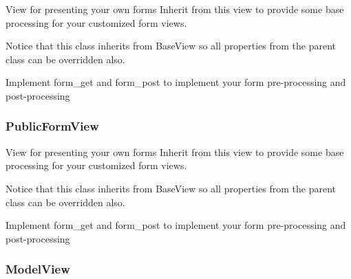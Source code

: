 \documentclass[letterpaper,10pt,english]{sphinxmanual}
\begin{document}
\begin{fulllineitems}
\label{api:flask.ext.appbuilder.views.SimpleFormView}
View for presenting your own forms
Inherit from this view to provide some base processing for your customized form views.

Notice that this class inherits from BaseView so all properties from the parent class can be overridden also.

Implement form\_get and form\_post to implement your form pre-processing and post-processing

\end{fulllineitems}



\subsubsection{PublicFormView}
\label{api:publicformview}

\begin{fulllineitems}
\label{api:flask.ext.appbuilder.views.PublicFormView}
View for presenting your own forms
Inherit from this view to provide some base processing for your customized form views.

Notice that this class inherits from BaseView so all properties from the parent class can be overridden also.

Implement form\_get and form\_post to implement your form pre-processing and post-processing

\end{fulllineitems}



\subsubsection{ModelView}
\label{api:modelview}
\end{document}
